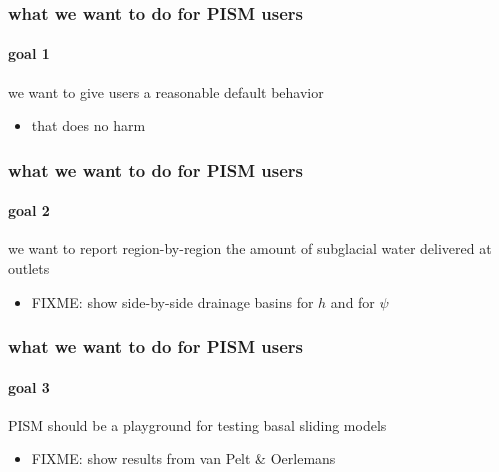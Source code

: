 \documentclass[hide notes,intlimits]{beamer}
\begin{document}
\newcommand{\goaltitle}{what we want to do for PISM users}


\begin{frame}
  \frametitle{\goaltitle}
  \framesubtitle{goal 1}
  
\begin{center}
  we want to give users a reasonable default behavior
\end{center}
  
  \begin{itemize}
    \item that does no harm
  \end{itemize}
\end{frame}


\begin{frame}
  \frametitle{\goaltitle}
  \framesubtitle{goal 2}
 
\begin{center}
  we want to report region-by-region the amount of subglacial water delivered at outlets
\end{center}
  
  \begin{itemize}
    \item FIXME: show side-by-side drainage basins for $h$ and for $\psi$
  \end{itemize}
\end{frame}


\begin{frame}
  \frametitle{\goaltitle}
  \framesubtitle{goal 3}

\begin{center}
   PISM should be a playground for testing basal sliding models
\end{center}
  
  \begin{itemize}
    \item FIXME:  show results from van Pelt \& Oerlemans
  \end{itemize}
\end{frame}
\end{document}
